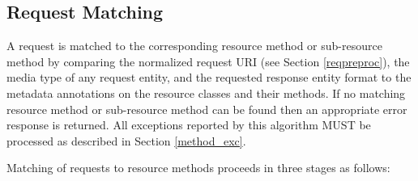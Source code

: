 \subsection{Request Matching}
\label{request_matching}

A request is matched to the corresponding resource method or sub-resource method by comparing the normalized request URI (see Section \ref{reqpreproc}), the media type of any request entity, and the requested response entity format to the metadata annotations on the resource classes and their methods. If no matching resource method or sub-resource method can be found then an appropriate error response is returned. All exceptions reported by this algorithm MUST be processed as described in Section \ref{method_exc}. 

Matching of requests to resource methods proceeds in three stages as follows:

